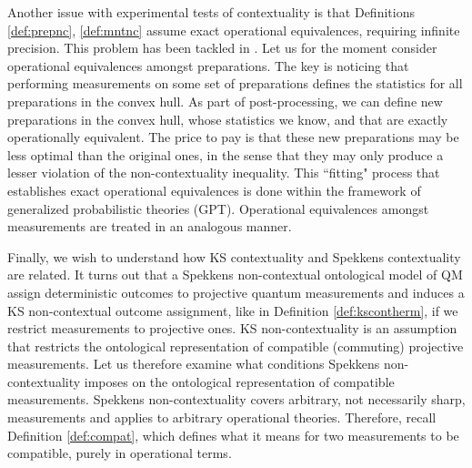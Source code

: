 Another issue with experimental tests of contextuality is that Definitions \ref{def:prepnc}, \ref{def:mntnc} assume exact operational equivalences, requiring infinite precision. This problem has been tackled in \cite{Pusey2018,Mazurek2016}. Let us for the moment consider operational equivalences amongst preparations. The key is noticing that performing measurements on some set of preparations defines the statistics for all preparations in the convex hull. As part of post-processing, we can define new preparations in the convex hull, whose statistics we know, and that are exactly operationally equivalent. The price to pay is that these new preparations may be less optimal than the original ones, in the sense that they may only produce a lesser violation of the non-contextuality inequality. This ``fitting" process that establishes exact operational equivalences is done within the framework of generalized probabilistic theories (GPT). Operational equivalences amongst measurements are treated in an analogous manner.

Finally, we wish to understand how KS contextuality and Spekkens contextuality are related. It turns out that a Spekkens non-contextual ontological model of QM assign deterministic outcomes to projective quantum measurements and induces a KS non-contextual outcome assignment, like in Definition \ref{def:kscontherm}, if we restrict measurements to projective ones. 
KS non-contextuality is an assumption that restricts the ontological representation of compatible (commuting) projective measurements. Let us therefore examine what conditions Spekkens non-contextuality imposes on the ontological representation of compatible measurements. Spekkens non-contextuality covers arbitrary, not necessarily sharp, measurements and applies to arbitrary operational theories. Therefore, recall Definition \ref{def:compat}, which defines what it means for two measurements to be compatible, purely in operational terms.

